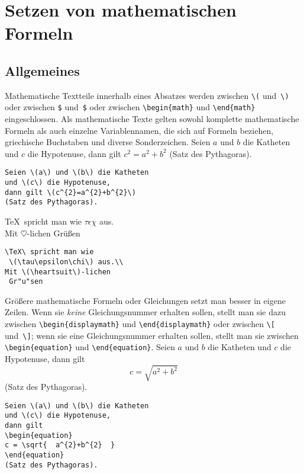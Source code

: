 
\section{Setzen von mathematischen Formeln} \label{math}
 
\subsection{Allgemeines}
 
Mathematische Textteile innerhalb eines Absatzes werden zwischen
\verb|\(| und~\verb|\)| oder zwischen \verb|$| und~\verb|$| oder
zwischen \verb|\begin{math}| und \verb|\end{math}|
eingeschlossen.
Als mathematische Texte gelten sowohl komplette mathematische
Formeln als auch einzelne Variablennamen, die sich auf Formeln
beziehen, griechische Buchstaben und diverse Sonderzeichen.
\exa
Seien \(a\) und \(b\) die Katheten
und \(c\) die Hypotenuse,
dann gilt \(c^{2}=a^{2}+b^{2}\)
(Satz des Pythagoras).
\exb
\begin{verbatim}
Seien \(a\) und \(b\) die Katheten
und \(c\) die Hypotenuse,
dann gilt \(c^{2}=a^{2}+b^{2}\)
(Satz des Pythagoras).
\end{verbatim}
\exc
\exa
\TeX\ spricht man wie
 \(\tau\epsilon\chi\) aus.\\[6pt]
Mit \(\heartsuit\)-lichen
 Grüßen
\exb
\begin{verbatim}
\TeX\ spricht man wie
 \(\tau\epsilon\chi\) aus.\\
Mit \(\heartsuit\)-lichen
 Gr"u"sen
\end{verbatim}
\exc
 
Größere mathematische Formeln oder Gleichungen setzt man besser
in eigene Zeilen. Wenn sie \emph{keine} Gleichungsnummer erhalten 
sollen, stellt man sie dazu zwischen \verb|\begin{displaymath}| und
\verb|\end{displaymath}| oder zwischen \verb|\[| und~\verb|\]|; 
wenn sie eine Gleichungsnummer erhalten sollen, stellt man sie
zwischen \verb|\begin{equation}| und \verb|\end{equation}|.
\exa
Seien \(a\) und \(b\) die Katheten
und \(c\) die Hypotenuse,
dann gilt
\begin{equation}
c = \sqrt{  a^{2}+b^{2}  }
\end{equation}
(Satz des Pythagoras).
\exb
\begin{verbatim}
Seien \(a\) und \(b\) die Katheten
und \(c\) die Hypotenuse,
dann gilt
\begin{equation}
c = \sqrt{  a^{2}+b^{2}  }
\end{equation}
(Satz des Pythagoras).
\end{verbatim}
\exc

